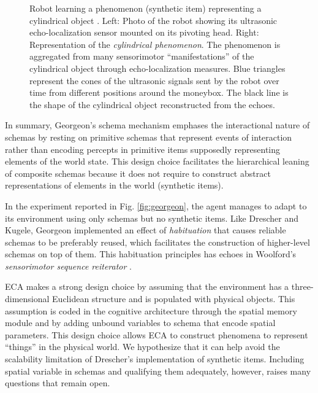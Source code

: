 \documentclass[runningheads]{llncs}
\begin{document}
\begin{figure}[htbp]
\begin{subfigure}{0.49\textwidth}
		\label{fig:second}
	\end{subfigure}
	\caption{Robot learning a phenomenon (synthetic item) representing a cylindrical object \cite[Fig. 5]{pmlr-v192-georgeon22a}.
		Left: Photo of the robot showing its ultrasonic echo-localization sensor mounted on its pivoting head. 
		Right: Representation of the \textit{cylindrical phenomenon}.
		The phenomenon is aggregated from many sensorimotor ``manifestations'' of the cylindrical object through echo-localization measures. 
		Blue triangles represent the cones of the ultrasonic signals sent by the robot over time from different positions around the moneybox.
		The black line is the shape of the cylindrical object reconstructed from the echoes. 
	}
	\label{fig:robot}
\end{figure}

In summary, Georgeon's schema mechanism emphases the interactional nature of schemas by resting on primitive schemas that represent events of interaction rather than encoding percepts in primitive items supposedly representing elements of the world state. 
This design choice facilitates the hierarchical leaning of composite schemas because it does not require to construct abstract representations of elements in the world (synthetic items).

In the experiment reported in Fig. \ref{fig:georgeon}, the agent manages to adapt to its environment using only schemas but no synthetic items.
Like Drescher and Kugele, Georgeon implemented an effect of \textit{habituation} that causes reliable schemas to be preferably reused, which facilitates the construction of higher-level schemas on top of them. 
This habituation principles has echoes in Woolford's \textit{sensorimotor sequence reiterator} \cite{woolford_precarious_2020}.


ECA makes a strong design choice by assuming that the environment has a three-dimensional Euclidean structure and is populated with physical objects. 
This assumption is coded in the cognitive architecture through the spatial memory module and by adding unbound variables to schema that encode spatial parameters. 
This design choice allows ECA to construct phenomena to represent ``things'' in the physical world. 
We hypothesize that it can help avoid the scalability limitation of Drescher's implementation of synthetic items. 
Including spatial variable in schemas and qualifying them adequately, however, raises many questions that remain open. 
\end{document}
